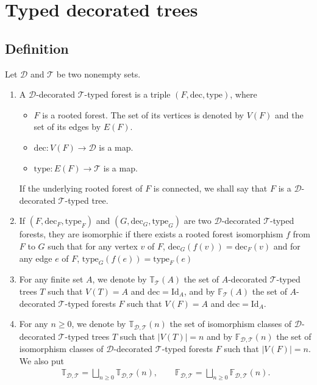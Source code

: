 \documentclass[11pt]{article}
\numberwithin{equation}{section}
\numberwithin{equation}{section}
\newcommand{\T}{\mathcal{T}}
\newcommand{\D}{\mathcal{D}}
\newcommand{\bfT}{\mathbb{T}}
\newcommand{\bfF}{\mathbb{F}}
\newcommand{\dec}{\mathrm{dec}}
\newcommand{\id}{\mathrm{Id}}
\newcommand{\type}{\mathrm{type}}
\begin{document}
\section{Typed decorated trees}

\subsection{Definition}

\begin{Definition}
Let $\D$ and $\T$ be two nonempty sets.
\begin{enumerate}\itemsep=0pt
\item A $\D$-decorated $\T$-typed forest is a triple $(F,\dec,\type)$, where
\begin{itemize}\itemsep=0pt
\item $F$ is a rooted forest. The set of its vertices is denoted by $V(F)$ and the set of its edges by $E(F)$.
\item $\dec\colon V(F)\longrightarrow \D$ is a map.
\item $\type\colon E(F)\longrightarrow \T$ is a map.
\end{itemize}
If the underlying rooted forest of $F$ is connected, we shall say that $F$ is a $\D$-decorated $\T$-typed tree.
\item If $(F,\dec_F,\type_F)$ and $(G,\dec_G,\type_G)$ are two $\D$-decorated $\T$-typed forests,
they are isomorphic if there exists a rooted forest isomorphism $f$ from $F$ to $G$ such that for any vertex $v$ of $F$,
$\dec_G(f(v))=\dec_F(v)$ and for any edge $e$ of $F$, $\type_G(f(e))=\type_F(e)$
\item For any finite set $A$, we denote by $\bfT_\T(A)$ the set of $A$-decorated
$\T$-typed trees $T$ such that $V(T)=A$
and $\dec=\id_A$, and by $\bfF_\T(A)$ the set of $A$-decorated $\T$-typed forests $F$ such that $V(F)=A$ and $\dec=\id_A$.
\item For any $n\geq 0$, we denote by $\bfT_{\D,\T}(n)$ the set of isomorphism classes of $\D$-decorated $\T$-typed trees $T$
such that $|V(T)|=n$ and by $\bfF_{\D,\T}(n)$ the set of isomorphism classes of $\D$-decorated $\T$-typed forests $F$
such that $|V(F)|=n$.
We also put
\begin{gather*}
\bfT_{\D,\T}=\bigsqcup_{n\geq 0} \bfT_{\D,\T}(n),\qquad
\bfF_{\D,\T}=\bigsqcup_{n\geq 0} \bfF_{\D,\T}(n).
\end{gather*}
\end{enumerate}
\end{Definition}
\end{document}
